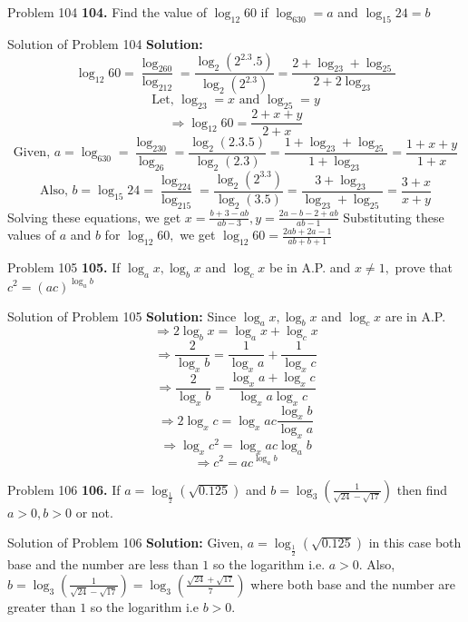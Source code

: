 \documentclass[aspectratio=169,8pt]{beamer}
\begin{document}
\begin{frame}{Problem 104}
  \textbf{104.} Find the value of $\log_{12}60$ if $\log_630 = a$ and $\log_{15}24 = b$
\end{frame}
\begin{frame}{Solution of Problem 104}
  \textbf{Solution:} $$\log_{12}60 = \frac{\log_260}{\log_212} = \frac{\log_2(2^2.3.5)}{\log_2(2^2.3)} = \frac{2 + \log_23 + \log_25}{2 + 2\log_23}$$
  $$\text{Let,~}\log_23 = x\text{~and~}\log_25 = y$$
  $$\Rightarrow \log_{12}60 = \frac{2 + x + y}{2 + x}$$
  $$\text{Given,~}a = \log_630 = \frac{\log_230}{\log_26} = \frac{\log_2(2.3.5)}{\log_2(2.3)} = \frac{1 + \log_23 + \log_25}{1 + \log_23} = \frac{1 + x + y}{1 + x}$$
  $$\text{Also,~}b = \log_{15}24 = \frac{\log_224}{\log_215} = \frac{\log_2(2^3.3)}{\log_2(3.5)} = \frac{3 + \log_23}{\log_23 + \log_25} = \frac{3 + x}{x + y}$$
  Solving these equations, we get $x = \frac{b + 3 - ab}{ab - 3}, y = \frac{2a - b - 2 + ab}{ab - 1}$
  \linebreak\linebreak
  Substituting these values of $a$ and $b$ for $\log_{12}60,$ we get
  $\log_{12}60 = \frac{2ab + 2a - 1}{ab + b + 1}$
\end{frame}
\begin{frame}{Problem 105}
  \textbf{105.} If $\log_ax, \log_bx$ and $\log_cx$ be in A.P. and $x\neq 1,$ prove that $c^2 = (ac)^{\log_ab}$
\end{frame}
\begin{frame}{Solution of Problem 105}
  \textbf{Solution:} Since $\log_ax, \log_bx$ and $\log_cx$ are in A.P.
  $$\Rightarrow 2\log_bx = \log_ax + \log_cx$$
  $$\Rightarrow \frac{2}{\log_xb} = \frac{1}{\log_xa} + \frac{1}{\log_xc}$$
  $$\Rightarrow \frac{2}{\log_xb} = \frac{\log_xa + \log_xc}{\log_xa\log_xc}$$
  $$\Rightarrow 2\log_xc = \log_xac\frac{\log_xb}{\log_xa}$$
  $$\Rightarrow \log_xc^2 = \log_xac\log_ab$$
  $$\Rightarrow c^2 = ac^{\log_ab}$$
\end{frame}
\begin{frame}{Problem 106}
  \textbf{106.} If $a = \log_{\frac{1}{2}}(\sqrt{0.125})$ and $b = \log_3\left(\frac{1}{\sqrt{24} - \sqrt{17}}\right)$ then find $a>0, b>0$ or not.
\end{frame}
\begin{frame}{Solution of Problem 106}
  \textbf{Solution:} Given, $a = \log_{\frac{1}{2}}(\sqrt{0.125})$ in this case both base and the number are less than $1$ so the logarithm i.e. $a > 0.$
  \linebreak\linebreak
  Also, $b = \log_3\left(\frac{1}{\sqrt{24} - \sqrt{17}}\right) = \log_3\left(\frac{\sqrt{24} + \sqrt{17}}{7}\right)$ where both base and the number are greater than $1$ so the logarithm i.e $b > 0.$
\end{frame}
\end{document}
